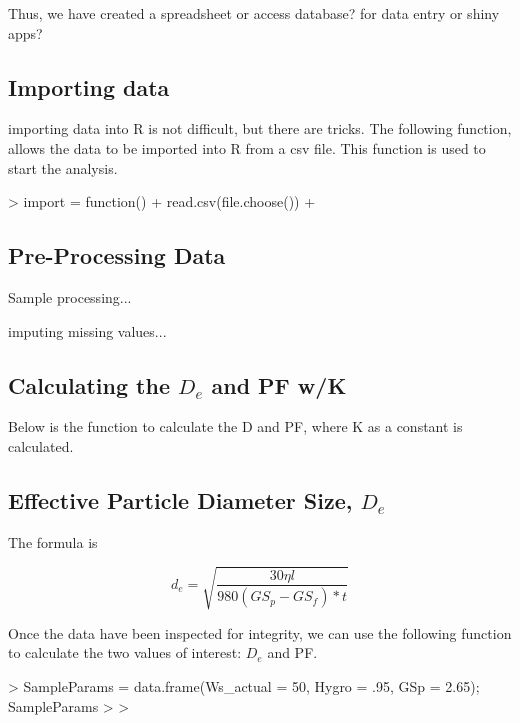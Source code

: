 Thus, we have created a spreadsheet or access database? for data entry or shiny apps?

\subsection{Importing data}

importing data into R is not difficult, but there are tricks. The following function, allows the data to be imported into R from a csv file. This function is used to start the analysis. 

\begin{Schunk}
\begin{Sinput}
> import = function(){
+ read.csv(file.choose())
+ }
\end{Sinput}
\end{Schunk}


\subsection{Pre-Processing Data}

Sample processing...

imputing missing values...

\subsection{Calculating the $D_e$ and PF w/K}

Below is the function to calculate the D and PF, where K as a constant is calculated. 

\subsection{Effective Particle Diameter Size, $D_e$}

The formula is 

\begin{equation}
d_e = \sqrt{\frac{30 \eta l}{980 (GS_p - GS_f)* t}}
\end{equation}

Once the data have been inspected for integrity, we can use the following function to calculate the two values of interest: $D_e$ and PF. 

\begin{Schunk}
\begin{Sinput}
> SampleParams = data.frame(Ws_actual = 50, Hygro = .95, GSp = 2.65); SampleParams
> 
> 
\end{Sinput}
\end{Schunk}

